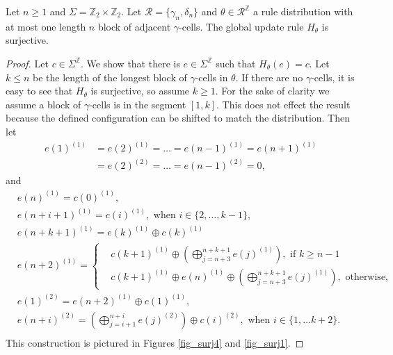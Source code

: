 \documentclass[runningheads]{llncs}
\newcommand{\Z}{\mathbb{Z}}
\begin{document}
\begin{lemma} \label{surj}
Let $n\geq 1$ and $\Sigma = \Z_2 \times \Z_2$. Let $\mathcal{R} = \{\gamma_n, \delta_n \}$ and $\theta \in \mathcal{R}^\Z$ a rule distribution with at most one length $n$ block of adjacent $\gamma$-cells. The global update rule $H_\theta$ is surjective.
\end{lemma}

\begin{proof}
Let $c \in \Sigma^\Z$. We show that there is $e\in \Sigma^\Z$ such that $H_\theta (e) = c$. Let $k\leq n$ be the length of the longest block of $\gamma$-cells in $\theta$. If there are no $\gamma$-cells, it is easy to see that $H_\theta$ is surjective, %
so assume $k \geq 1$. For the sake of clarity we assume a block of $\gamma$-cells is in the segment $[1,k]$. This does not effect the result because the defined configuration can be shifted to match the distribution. Then let
\begin{align*}
e(1)^{(1)} &= e(2)^{(1)} = \ldots = e(n-1)^{(1)} = e(n+1)^{(1)} \\
&= e(2)^{(2)} = \ldots = e(n-1)^{(2)} = 0,
\end{align*}
and 
\begin{align*}
&e(n)^{(1)} = c(0)^{(1)},\\ 
&e(n+i+1)^{(1)} = c(i)^{(1)}, \text{ when } i\in \{2,\ldots, k-1 \},\\
&e(n+k+1)^{(1)} = e(k)^{(1)} \oplus c(k)^{(1)}\\
&e(n+2)^{(1)} = \begin{cases}
&c(k+1)^{(1)} \oplus (\bigoplus_{j=n+3}^{n+k+1} e(j)^{(1)}), \text{ if } k\geq n-1 \\
&c(k+1)^{(1)} \oplus e(n)^{(1)} \oplus (\bigoplus_{j=n+3}^{n+k+1} e(j)^{(1)}),\text{ otherwise,}
\end{cases}\\
&e(1)^{(2)} = e(n+2)^{(1)} \oplus c(1)^{(1)}, \\
&e(n+i)^{(2)} =(\bigoplus_{j=i+1}^{n+i} e(j)^{(2)}) \oplus c(i)^{(2)}, \text{ when } i \in \{1, \ldots k+2\}. \\
\end{align*}
This construction is pictured in Figures \ref{fig_surj4} and \ref{fig_surj1}.




\end{proof}
\end{document}
